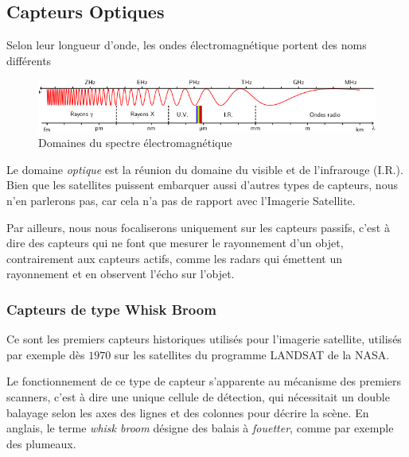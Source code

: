 \documentclass[a4paper, 11pt]{report}
\begin{document}
\subsection{Capteurs Optiques}
Selon leur longueur d'onde, les ondes électromagnétique portent des noms différents
\begin{figure}[H]
	\begin{center}
		\includegraphics[scale=0.5]{Images/Spectre_Electromagnetique.png}
		\caption{Domaines du spectre électromagnétique}
	\end{center}
\end{figure}
Le domaine \emph{optique} est la réunion du domaine du visible et de l'infrarouge (I.R.).
Bien que les satellites puissent embarquer aussi d'autres types de capteurs, nous n'en parlerons pas, car cela n'a pas de rapport avec l'Imagerie Satellite.

Par ailleurs, nous nous focaliserons uniquement sur les capteurs passifs, c'est à dire des capteurs qui ne font que mesurer le rayonnement d'un objet, contrairement aux capteurs actifs, comme les radars qui émettent un rayonnement et en observent l'écho sur l'objet.
\subsubsection{Capteurs de type Whisk Broom}
Ce sont les premiers capteurs historiques utilisés pour l'imagerie satellite, utilisés par exemple dès $1970$ sur les satellites du programme LANDSAT de la NASA.

Le fonctionnement de ce type de capteur s'apparente au mécanisme des premiers scanners, c'est à dire une unique cellule de détection, qui nécessitait un double balayage selon les axes des lignes et des colonnes pour décrire la scène.
En anglais, le terme \emph{whisk broom} désigne des balais à \emph{fouetter}, comme par exemple des plumeaux.
\end{document}
